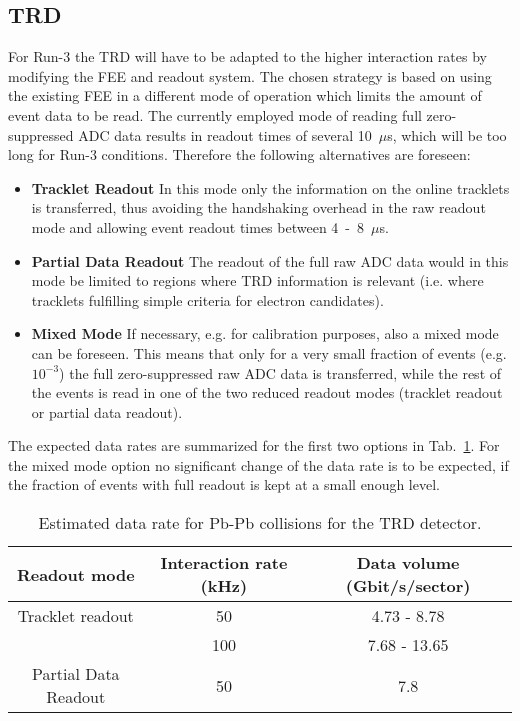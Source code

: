 \subsection{TRD}
\label{TRD:datarate}

For Run-3 the TRD will have to be adapted to the higher interaction
rates by modifying the FEE and readout system.  The chosen strategy is
based on using the existing FEE in a different mode of operation which
limits the amount of event data to be read.  The currently employed
mode of reading full zero-suppressed ADC data results in readout times
of several 10~$\mu$s, which will be too long for Run-3 conditions.
Therefore the following alternatives are foreseen:
\begin{itemize}
\item {\bf Tracklet Readout} In this mode only the information on the
  online tracklets is transferred, thus avoiding the handshaking
  overhead in the raw readout mode and allowing event readout times
  between 4~-~8~$\mu$s.
\item {\bf Partial Data Readout} The readout of the full raw ADC data
  would in this mode be limited to regions where TRD information is
  relevant (i.e. where tracklets fulfilling simple criteria for
  electron candidates).
\item {\bf Mixed Mode} If necessary, e.g. for calibration purposes,
  also a mixed mode can be foreseen.  This means that only for a very
  small fraction of events (e.g. $10^{-3}$) the full zero-suppressed
  raw ADC data is transferred, while the rest of the events is read in
  one of the two reduced readout modes (tracklet readout or partial
  data readout).
\end{itemize}
%
The expected data rates are summarized for the first two options in
Tab.~\ref{tab:TRD:eventSize}.  For the mixed mode option no
significant change of the data rate is to be expected, if the fraction
of events with full readout is kept at a small enough level.
%
\begin{table}[ht]
  \centering
  \begin{tabular}{|c|c|c|}\hline
    Readout mode         & Interaction rate (kHz) & Data volume (Gbit/s/sector) \\ \hline
    Tracklet readout     & 50                     & 4.73 - 8.78    \\
                         & 100                    & 7.68 - 13.65   \\ \hline
    Partial Data Readout & 50                     & 7.8            \\ \hline
  \end{tabular}
  \caption{Estimated data rate for Pb-Pb collisions for the TRD
    detector.}
  \label{tab:TRD:eventSize}
\end{table}
